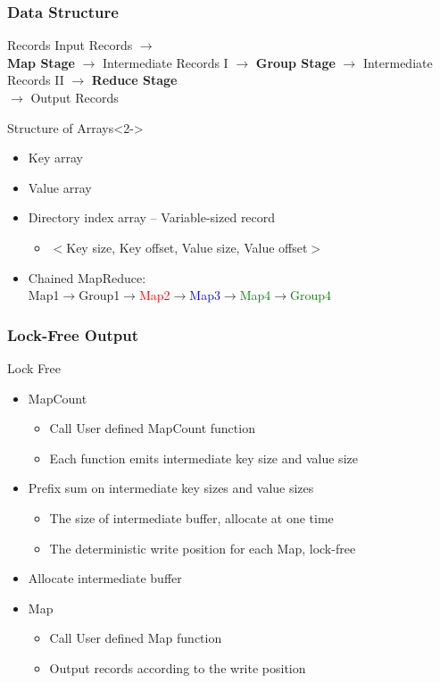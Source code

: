 \begin{frame}
\frametitle{Data Structure}
\begin{block}{Records}
Input Records $\rightarrow$ \\
\textbf{Map Stage} $\rightarrow$ Intermediate Records I $\rightarrow$ 
\textbf{Group Stage} $\rightarrow$ Intermediate Records II $\rightarrow$ \textbf{Reduce Stage} \\
$\rightarrow$ Output Records
\end{block}
\begin{block}{Structure of Arrays}<2->
\begin{itemize}
\item Key array
\item Value array
\item Directory index array -- Variable-sized record
\begin{itemize}
\item $<$Key size, Key offset, Value size, Value offset$>$
\end{itemize}
\item<3-> Chained MapReduce: \\
Map1$\rightarrow$Group1$\rightarrow$\textcolor{red}{Map2}$\rightarrow$\textcolor{blue}{Map3}$\rightarrow$\textcolor{green}{Map4}$\rightarrow$\textcolor{green}{Group4}
\end{itemize}
\end{block}
\end{frame}


\begin{frame}
\frametitle{Lock-Free Output}
\begin{block}{Lock Free}
\begin{itemize}
\item MapCount
\begin{itemize}
\item Call User defined MapCount function
\item Each function emits intermediate key size and value size
\end{itemize}
\item<2-> Prefix sum on intermediate key sizes and value sizes
\begin{itemize}
\item<2-> The size of intermediate buffer, allocate at one time
\item<2-> The deterministic write position for each Map, lock-free
\end{itemize}
\item<3-> Allocate intermediate buffer
\item<4-> Map
\begin{itemize}
\item<4-> Call User defined Map function
\item<4-> Output records according to the write position
\end{itemize}
\end{itemize}
\end{block}
\end{frame}

